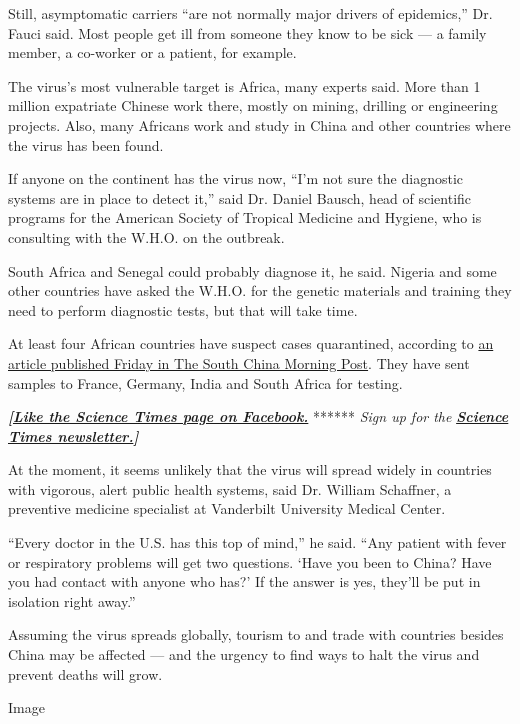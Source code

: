 Still, asymptomatic carriers ``are not normally major drivers of
epidemics,'' Dr. Fauci said. Most people get ill from someone they know
to be sick --- a family member, a co-worker or a patient, for example.

The virus's most vulnerable target is Africa, many experts said. More
than 1 million expatriate Chinese work there, mostly on mining, drilling
or engineering projects. Also, many Africans work and study in China and
other countries where the virus has been found.

If anyone on the continent has the virus now, ``I'm not sure the
diagnostic systems are in place to detect it,'' said Dr. Daniel Bausch,
head of scientific programs for the American Society of Tropical
Medicine and Hygiene, who is consulting with the W.H.O. on the outbreak.

South Africa and Senegal could probably diagnose it, he said. Nigeria
and some other countries have asked the W.H.O. for the genetic materials
and training they need to perform diagnostic tests, but that will take
time.

At least four African countries have suspect cases quarantined,
according to
\href{https://www.scmp.com/news/china/article/3048310/china-coronavirus-african-nations-quarantine-symptomatic-passengers}{an
article published Friday in The South China Morning Post}. They have
sent samples to France, Germany, India and South Africa for testing.

\textbf{\emph{{[}}\href{http://on.fb.me/1paTQ1h}{\emph{Like the Science
Times page on Facebook.}}} ****** \emph{\textbar{} Sign up for the}
\textbf{\href{http://nyti.ms/1MbHaRU}{\emph{Science Times
newsletter.}}\emph{{]}}}

At the moment, it seems unlikely that the virus will spread widely in
countries with vigorous, alert public health systems, said Dr. William
Schaffner, a preventive medicine specialist at Vanderbilt University
Medical Center.

``Every doctor in the U.S. has this top of mind,'' he said. ``Any
patient with fever or respiratory problems will get two questions. `Have
you been to China? Have you had contact with anyone who has?' If the
answer is yes, they'll be put in isolation right away.''

Assuming the virus spreads globally, tourism to and trade with countries
besides China may be affected --- and the urgency to find ways to halt
the virus and prevent deaths will grow.

Image

